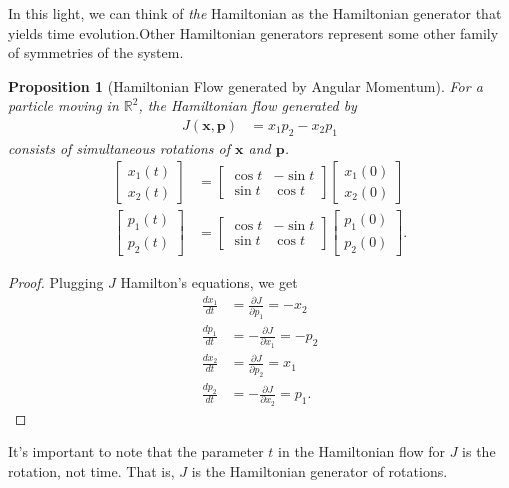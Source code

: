 \documentclass[12pt]{extarticle}
\newcommand{\R}{\mathbb{R}}
\theoremstyle{plain}
\newtheorem*{proposition}{Proposition}%
\theoremstyle{definition}
\theoremstyle{remark}
\renewcommand{\newline}{\hfill\break}
\begin{document}
  In this light, we can think of \textit{the} Hamiltonian as the Hamiltonian generator that yields time evolution.Other Hamiltonian generators represent some other family of symmetries of the system.
  \begin{proposition}[Hamiltonian Flow generated by Angular Momentum]
    For a particle moving in $\R^2$, the Hamiltonian  flow generated by 
    \begin{align*}
      J(\mathbf{x},\mathbf{p}) &= x_1p_2 - x_2p_1
    \end{align*}
    consists of simultaneous rotations of $\mathbf{x}$ and $\mathbf{p}$.
    \begin{align*}
      \begin{bmatrix}x_1(t)\\x_2(t)\end{bmatrix} &= \begin{bmatrix}\cos t & -\sin t\\\sin t& \cos t\end{bmatrix} \begin{bmatrix}x_1(0)\\x_2(0)\end{bmatrix}\\
      \begin{bmatrix}p_1(t)\\p_2(t)\end{bmatrix} &= \begin{bmatrix}\cos t & -\sin t \\ \sin t & \cos t\end{bmatrix} \begin{bmatrix}p_1(0) \\ p_2(0)\end{bmatrix}.
    \end{align*}
  \end{proposition}
  \begin{proof}
    Plugging $J$ Hamilton's equations, we get
        \begin{align*}
          \frac{dx_1}{dt} &= \frac{\partial J}{\partial p_1} = -x_2\\
          \frac{dp_1}{dt} &= -\frac{\partial J}{\partial x_1} = -p_2\\
          \frac{dx_2}{dt} &= \frac{\partial J}{\partial p_2} = x_1\\
          \frac{dp_2}{dt} &= -\frac{\partial J}{\partial x_2} = p_1.
        \end{align*}
  \end{proof}
  It's important to note that the parameter $t$ in the Hamiltonian flow for $J$ is the rotation, not time. That is, $J$ is the Hamiltonian generator of rotations.\newline
\end{document}
